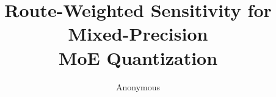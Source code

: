 \documentclass[11pt]{article}
\title{Route-Weighted Sensitivity for Mixed-Precision \\ MoE Quantization}
\author{Anonymous}
\date{}
\begin{document}
\maketitle

\begin{abstract}

\end{abstract}












\appendix



\end{document}
